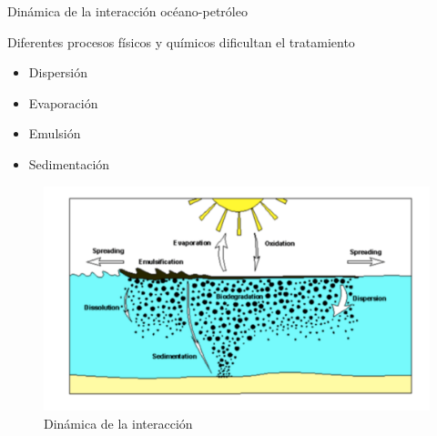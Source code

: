 \begin{frame}{Dinámica de la interacción océano-petróleo}
    \footnotesize
    \begin{block}{Diferentes procesos físicos y químicos dificultan el tratamiento}
      \begin{itemize}
        \item Dispersión
        \item Evaporación
        \item Emulsión
        \item Sedimentación
      \end{itemize}
    \end{block}
    \begin{figure}
      \centering
      \includegraphics[scale=0.3]{img/section_01/dinamica-derrame.png}
      \caption{Dinámica de la interacción}
      \label{fig:section_01_dinamica_derrame}
    \end{figure}    
\end{frame}
